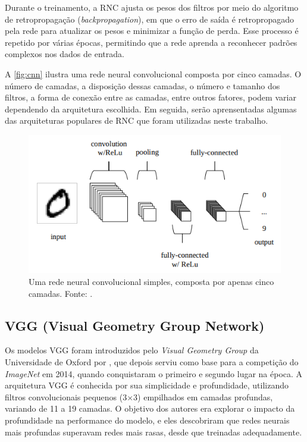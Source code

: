 Durante o treinamento, a RNC ajusta os pesos dos filtros por meio do algoritmo de retropropagação (\textit{backpropagation}), em que o erro de saída é retropropagado pela rede para atualizar os pesos e minimizar a função de perda. Esse processo é repetido por várias épocas, permitindo que a rede aprenda a reconhecer padrões complexos nos dados de entrada.

A \autoref{fig:cnn} ilustra uma rede neural convolucional composta por cinco camadas. O número de camadas, a disposição dessas camadas, o número e tamanho dos filtros, a forma de conexão entre as camadas, entre outros fatores, podem variar dependendo da arquitetura escolhida. Em seguida, serão aprensentadas algumas das arquiteturas populares de RNC que foram utilizadas neste trabalho.

\begin{figure}[h]
    \centering
    \includegraphics[width=0.7\linewidth]{figs/convolution-neural-network.png}
    \caption{Uma rede neural convolucional simples, composta por apenas cinco camadas. Fonte: \cite{Saxena2022}.}
    \label{fig:cnn}
\end{figure}

\subsection{VGG (Visual Geometry Group Network)}

Os modelos VGG foram introduzidos pelo \textit{Visual Geometry Group} da Universidade de Oxford por \cite{Simonyan2015}, que depois serviu como base para a competição do \textit{ImageNet} em 2014, quando conquistaram o primeiro e segundo lugar na época. A arquitetura VGG é conhecida por sua simplicidade e profundidade, utilizando filtros convolucionais pequenos (3×3) empilhados em camadas profundas, variando de 11 a 19 camadas. O objetivo dos autores era explorar o impacto da profundidade na performance do modelo, e eles descobriram que redes neurais mais profundas superavam redes mais rasas, desde que treinadas adequadamente.

